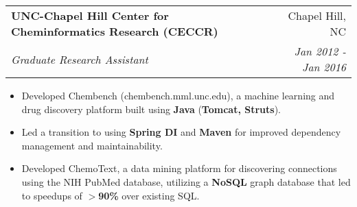\documentclass[letterpaper,11pt]{article}
\makeatletter
\newcommand{\resumeItem}[2]{
  \item\small{
    \textbf{#1}{#2 \vspace{-2pt}}
  }
}
\newcommand{\resumeSubheading}[4]{
  \vspace{-1pt}\item
    \begin{tabular*}{0.97\textwidth}[t]{l@{\extracolsep{\fill}}r}
      \textbf{#1} & #2 \\
      \textit{\small#3} & \textit{\small #4} \\
    \end{tabular*}\vspace{-5pt}
}
\newcommand{\resumeItemListStart}{\begin{itemize}}
\newcommand{\resumeItemListEnd}{\end{itemize}\vspace{-5pt}}
\makeatother
\begin{document}



\resumeSubheading
{UNC-Chapel Hill Center for Cheminformatics Research (CECCR)}{Chapel Hill, NC}
{Graduate Research Assistant}{Jan 2012 - Jan 2016}
\resumeItemListStart
\resumeItem{}
{Developed Chembench (chembench.mml.unc.edu), a machine learning and drug discovery platform built using \textbf{Java} (\textbf{Tomcat, Struts}).}
\resumeItem{}
{Led a transition to using \textbf{Spring DI} and \textbf{Maven} for improved dependency management and maintainability.}
\resumeItem{}
{Developed ChemoText, a data mining platform for discovering connections using the NIH PubMed database, utilizing a \textbf{NoSQL} graph database that led to speedups of \textbf{$>$90\%} over existing SQL.}
\resumeItemListEnd


\end{document}

